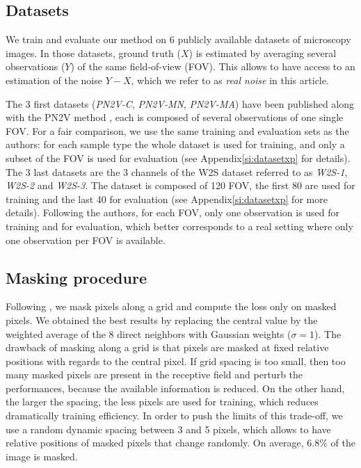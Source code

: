 \documentclass[lettersize,journal]{IEEEtran}
\begin{document}
\subsection{Datasets}
\label{sec:datasets}
We train and evaluate our method on 6 publicly available datasets of microscopy images. In those datasets, ground truth ($X$) is estimated by averaging several observations ($Y$) of the same field-of-view (FOV).
This allows to have access to an estimation of the noise $Y-X$, which we refer to as \textit{real noise} in this article.

The 3 first datasets (\emph{PN2V-C}, \emph{PN2V-MN}, \emph{PN2V-MA}) have been published along with the PN2V method \cite{krull2019probabilistic}, each is composed of several observations of one single FOV.
For a fair comparison, we use the same training and evaluation sets as the authors: for each sample type the whole dataset is used for training, and only a subset of the FOV is used for evaluation (see Appendix\ref{si:datasetxp} for details).
The 3 last datasets are the 3 channels of the W2S dataset \cite{zhou2020w2s} referred to as \emph{W2S-1}, \emph{W2S-2} and \emph{W2S-3}.
The dataset is composed of 120 FOV, the first 80 are used for training and the last 40 for evaluation (see Appendix\ref{si:datasetxp} for more details).
Following the authors, for each FOV, only one observation is used for training and for evaluation, which better corresponds to a real setting where only one observation per FOV is available.

\subsection{Masking procedure}
\label{sec:masking}
Following \cite{batson2019noise2self}, we mask pixels along a grid and compute the loss only on masked pixels.
We obtained the best results by replacing the central value by the weighted average of the 8 direct neighbors with Gaussian weights ($\sigma=1$).
The drawback of masking along a grid is that pixels are masked at fixed relative positions with regards to the central pixel.
If grid spacing is too small, then too many masked pixels are present in the receptive field and perturb the performances, because the available information is reduced.
On the other hand, the larger the spacing, the less pixels are used for training, which reduces dramatically training efficiency.
In order to push the limits of this trade-off, we use a random dynamic spacing between 3 and 5 pixels, which allows to have relative positions of masked pixels that change randomly.
On average, $6.8\%$ of the image is masked.
\end{document}
